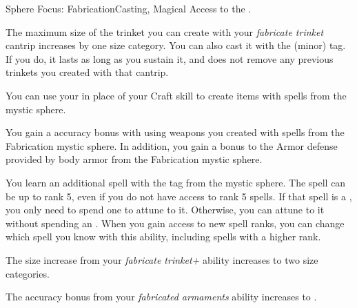     \begin{magicalfeat}{Sphere Focus: Fabrication}{Casting, Magical}
        \featpre Access to the  .

         The maximum size of the trinket you can create with your \textit{fabricate trinket} cantrip increases by one size category.
        You can also cast it with the  (minor) tag.
        If you do, it lasts as long as you sustain it, and does not remove any previous trinkets you created with that cantrip.

         You can use your  in place of your Craft skill to create items with spells from the  mystic sphere.

         You gain a  accuracy bonus with  using weapons you created with spells from the Fabrication mystic sphere.
        In addition, you gain a  bonus to the Armor defense provided by body armor from the Fabrication mystic sphere.

         You learn an additional spell with the  tag from the  mystic sphere.
        The spell can be up to rank 5, even if you do not have access to rank 5 spells.
        If that spell is a , you only need to spend one  to attune to it.
        Otherwise, you can attune to it without spending an .
        When you gain access to new spell ranks, you can change which spell you know with this ability, including spells with a higher rank.

         The size increase from your \textit{fabricate trinket+} ability increases to two size categories.

         The accuracy bonus from your \textit{fabricated armaments} ability increases to .
    \end{magicalfeat}

